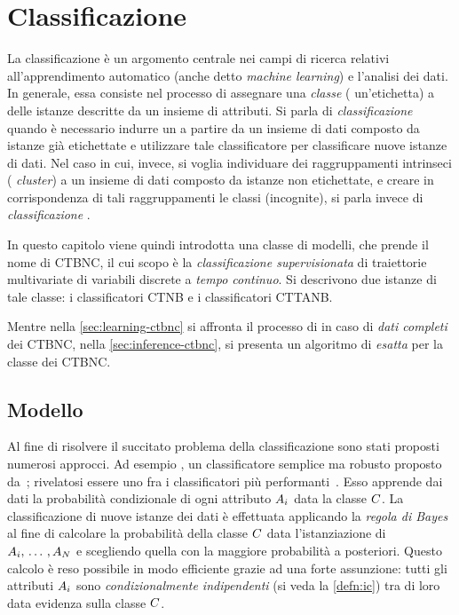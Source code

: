 
\chapter{Classificazione}
\label{cap:ctbnc}
La classificazione è un argomento centrale nei campi di ricerca relativi all'apprendimento automatico (anche detto \emph{machine learning}) e l'analisi dei dati. In generale, essa consiste nel processo di assegnare una \emph{classe} (\ie{} un'etichetta) a delle istanze descritte da un insieme di attributi. Si parla di \emph{classificazione } quando è necessario indurre un  a partire da un insieme di dati composto da istanze già etichettate e utilizzare tale classificatore per classificare nuove istanze di dati. Nel caso in cui, invece, si voglia individuare dei raggruppamenti intrinseci (\ie{} \emph{cluster}) a un insieme di dati composto da istanze non etichettate, e creare in corrispondenza di tali raggruppamenti le classi (incognite), si parla invece di \emph{classificazione }.

In questo capitolo viene quindi introdotta una classe di modelli, che prende il nome di \acf{CTBNC}, il cui scopo è la \emph{classificazione supervisionata} di traiettorie multivariate di variabili discrete a \emph{tempo continuo}. Si descrivono due istanze di tale classe: i classificatori \acf{CTNB} e i classificatori \acf{CTTANB}.

Mentre nella \autoref{sec:learning-ctbnc} si affronta il processo di \emph{} in caso di \emph{dati completi} dei \acs{CTBNC}, nella \autoref{sec:inference-ctbnc}, si presenta un algoritmo di \emph{ esatta} per la classe dei \acs{CTBNC}.

\section{Modello}\label{sec:ctbnc-model}
Al fine di risolvere il succitato problema della classificazione sono stati proposti numerosi approcci. Ad esempio \lwcase \nb{} \class{}, un classificatore semplice ma robusto proposto da~\citet{DudaHart1973}; rivelatosi essere uno fra i classificatori più performanti~\citep{Langley1992}. Esso apprende dai dati la probabilità condizionale di ogni attributo $\mathnormal{A}_i$ data la classe $\mathnormal{C}$. La classificazione di nuove istanze dei dati è effettuata applicando la \emph{regola di Bayes} al fine di calcolare la probabilità della classe $\mathnormal{C}$ data l'istanziazione di $\mathnormal{A}_i,\,\dotsc\,,\mathnormal{A}_N$ e scegliendo quella con la maggiore probabilità a posteriori. Questo calcolo è reso possibile in modo efficiente grazie ad una forte assunzione: tutti gli attributi $\mathnormal{A}_i$ sono \emph{condizionalmente indipendenti} (si veda la \autoref{defn:ic}) tra di loro data evidenza sulla classe $\mathnormal{C}$.

